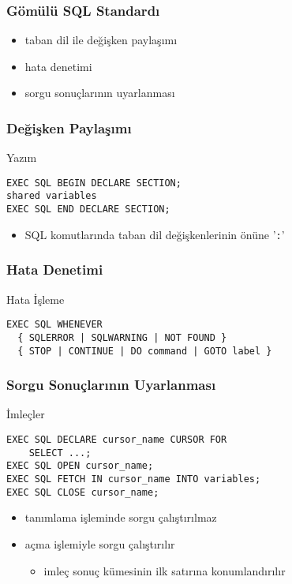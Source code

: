 \documentclass[dvipsnames]{beamer}
\theoremstyle{definition}
\theoremstyle{example}
\theoremstyle{plain}
\begin{document}
\begin{frame}
  \frametitle{Gömülü SQL Standardı}

  \begin{itemize}
    \item taban dil ile değişken paylaşımı
    \item hata denetimi
    \item sorgu sonuçlarının uyarlanması
  \end{itemize}
\end{frame}

\begin{frame}[fragile]
  \frametitle{Değişken Paylaşımı}

  \begin{block}{Yazım}
    \begin{lstlisting}
EXEC SQL BEGIN DECLARE SECTION;
shared variables
EXEC SQL END DECLARE SECTION;
    \end{lstlisting}
  \end{block}

  \begin{itemize}
    \item SQL komutlarında taban dil değişkenlerinin önüne '\lstinline!:!'
  \end{itemize}
\end{frame}

\begin{frame}[fragile]
  \frametitle{Hata Denetimi}

  \begin{block}{Hata İşleme}
    \begin{lstlisting}
EXEC SQL WHENEVER
  { SQLERROR | SQLWARNING | NOT FOUND }
  { STOP | CONTINUE | DO command | GOTO label }
    \end{lstlisting}
  \end{block}
\end{frame}

\begin{frame}[fragile]
  \frametitle{Sorgu Sonuçlarının Uyarlanması}

  \begin{block}{İmleçler}
    \begin{lstlisting}
EXEC SQL DECLARE cursor_name CURSOR FOR
    SELECT ...;
EXEC SQL OPEN cursor_name;
EXEC SQL FETCH IN cursor_name INTO variables;
EXEC SQL CLOSE cursor_name;
    \end{lstlisting}
  \end{block}

  \pause
  \begin{itemize}
    \item tanımlama işleminde sorgu çalıştırılmaz
    \item açma işlemiyle sorgu çalıştırılır
    \begin{itemize}
      \item imleç sonuç kümesinin ilk satırına konumlandırılır
    \end{itemize}
  \end{itemize}
\end{frame}
\end{document}
